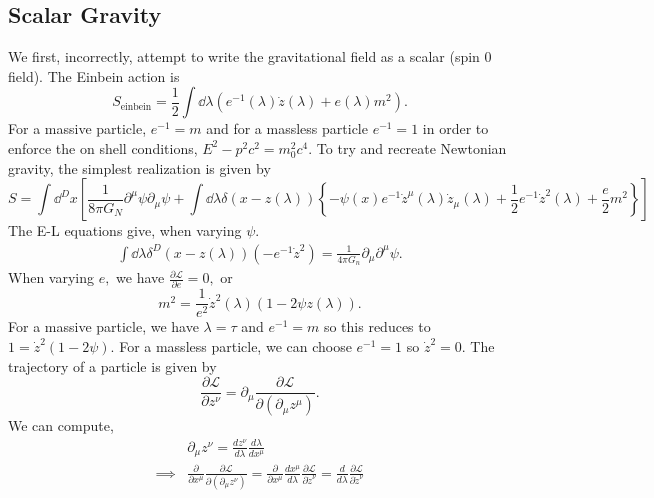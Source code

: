 \documentclass{article}
\numberwithin{equation}{section}
\begin{document}
\subsection{Scalar Gravity}
We first, incorrectly, attempt to write the gravitational field as a scalar (spin 0 field). The Einbein action is 
\begin{equation}
    S_\text{einbein} = \frac{1}{2}\int \dd{\lambda}(e^{-1}(\lambda)\dot{z}(\lambda) + e(\lambda)m^2).
\end{equation}
For a massive particle, $e^{-1}=m$ and for a massless particle $e^{-1}=1$ in order to enforce the on shell conditions, $E^2-p^2c^2=m_0^2c^4.$ To try and recreate Newtonian gravity, the simplest realization is given by 
\begin{equation}
    S = \int \dd^D x\left[\frac{1}{8\pi G_N} \partial^{\mu}\psi\partial_{\mu}\psi + \int \dd{\lambda} \delta(x-z(\lambda))\left\{-\psi(x)e^{-1}\dot{z}^{\mu}(\lambda)\dot{z}_\mu(\lambda) + \frac{1}{2}e^{-1}\dot{z}^2(\lambda) + \frac{e}{2}m^2\right\}\right]
\end{equation}
The E-L equations give, when varying $\psi.$
\begin{align}
    \int \dd{\lambda} \delta^D(x-z(\lambda))(-e^{-1}\dot{z}^2) = \frac{1}{4\pi G_n}\partial_{\mu}\partial^{\mu}\psi.
\end{align}
When varying $e,$ we have $\frac{\partial \mathcal{L}}{\partial e}=0,$ or 
\begin{equation}
    m^2 = \frac{1}{e^2}\dot{z}^2(\lambda)(1-2\psi z(\lambda)).
\end{equation}
For a massive particle, we have $\lambda=\tau$ and $e^{-1}=m$ so this reduces to $1=\dot{z}^2(1-2\psi).$ For a massless particle, we can choose $e^{-1}=1$ so $\dot{z}^2=0.$ The trajectory of a particle is given by 
\begin{equation}
    \frac{\partial \mathcal{L}}{\partial z^{\nu}} = \partial_{\mu}\frac{\partial \mathcal{L}}{\partial (\partial_{\mu}z^{\mu})}.
\end{equation}
We can compute,
\begin{align}
    &\partial_\mu z^{\nu} = \frac{dz^{\nu}}{d\lambda}\frac{d\lambda}{dx^{\mu}} \\ 
    \implies & \frac{\partial}{\partial x^{\mu}} \frac{\partial \mathcal{L}}{\partial(\partial_{\mu}z^{\nu})} = \frac{\partial}{\partial x^{\mu}}\frac{dx^{\mu}}{d\lambda}\frac{\partial \mathcal{L}}{\partial \dot{z}^{\nu}} = \frac{d}{d\lambda}\frac{\partial \mathcal{L}}{\partial \dot{z}^{\nu}}
\end{align}
\end{document}
